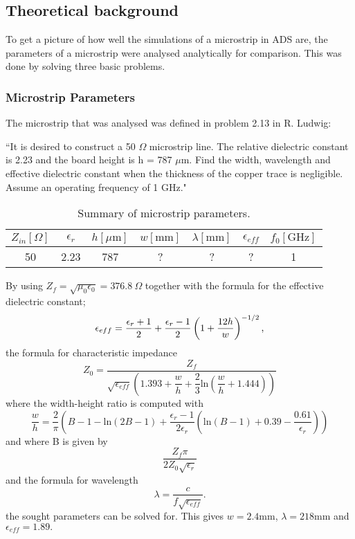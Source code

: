 \documentclass[report.tex]{subfiles}
\begin{document}
\subsection{Theoretical background}\label{sec: Lab1 Theoretical Background}
To get a picture of how well the simulations of a microstrip in ADS are, the parameters of a microstrip  were analysed analytically for comparison. This was done by solving three basic problems.

\subsubsection{Microstrip Parameters}\label{subsubsec: Microstrip_Parameters}
The microstrip that was analysed was defined in problem 2.13 in R. Ludwig:

``It is desired to construct a 50 $\Omega$ microstrip line. The relative dielectric constant is 2.23 and the board height is h = 787 $\mu \text{m.}$ Find the width, wavelength and effective dielectric constant when the thickness of the copper trace is negligible. Assume an operating frequency of 1 GHz."

\begin{table}[h]
    \centering
    \caption{Summary of microstrip parameters.}
    \begin{tabular}{c | c | c | c | c | c | c}
        $Z_{in} [\Omega]$ & $\epsilon_r $ & $h [\mu \text{m}]$ & $w [\text{mm}]$ & $\lambda [\text{mm}]$ & $\epsilon_{eff}$ & $f_0 [\text{GHz}]$\\
        \hline
         50 & 2.23 & 787 & ? & ? & ? & 1
    \end{tabular}
    \label{table: Lab1 Microstrip parameters}
\end{table}

By using $Z_{f} = \sqrt{\mu_{0} \epsilon_{0}} = 376.8\:\Omega$ together with the formula for the effective dielectric constant;
\begin{equation}
	\epsilon_{eff} = \dfrac{\epsilon_{r} + 1}{2} + \dfrac{\epsilon_{r} - 1}{2} \left(1 + {\dfrac{12 h}{w}} \right)^{-1/2} \text ,
\end{equation}
the formula for characteristic impedance
\begin{equation}
	Z_0 = \dfrac{Z_f}{\sqrt{\epsilon_{eff}}\left(1.393 + \dfrac{w}{h} + \dfrac{2}{3} \text{ln}\left(\dfrac{w}{h} + 1.444 \right)\right)}
\end{equation}
where the width-height ratio is computed with
\begin{equation}
	\dfrac{w}{h} = \dfrac{2}{\pi}\left(B - 1 - \text{ln}\left(2B - 1 \right) + \dfrac{\epsilon_r - 1}{2 \epsilon_r}\left(\text{ln}\left(B -1\right) + 0.39 - \dfrac{0.61}{\epsilon_r}\right)\right)
\end{equation}
and where B is given by
\begin{equation}
\dfrac{Z_f \pi}{2Z_0\sqrt{\epsilon_r}}
\end{equation}
and the formula for wavelength
\begin{equation}
	\lambda = \dfrac{c}{f\sqrt{\epsilon_{eff}}}.
\end{equation}
the sought parameters can be solved for. This gives $w = 2.4 \text{mm}$, $\lambda = 218 \text{mm}$ and $\epsilon_{eff} = 1.89 \text{.}$
\end{document}
